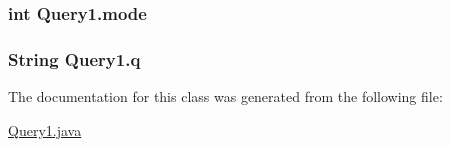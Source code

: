 \subsubsection[{\texorpdfstring{mode}{mode}}]{\setlength{\rightskip}{0pt plus 5cm}int Query1.\+mode\hspace{0.3cm}{\ttfamily [private]}}\hypertarget{classQuery1_a91868e1771a4ea60d950ffd61c56827d}{}\label{classQuery1_a91868e1771a4ea60d950ffd61c56827d}
\subsubsection[{\texorpdfstring{q}{q}}]{\setlength{\rightskip}{0pt plus 5cm}String Query1.\+q\hspace{0.3cm}{\ttfamily [private]}}\hypertarget{classQuery1_acaa7bb7db670b4e6ffce9380b960b9e3}{}\label{classQuery1_acaa7bb7db670b4e6ffce9380b960b9e3}


The documentation for this class was generated from the following file\+:\begin{DoxyCompactItemize}
\item 
\hyperlink{Query1_8java}{Query1.\+java}\end{DoxyCompactItemize}
